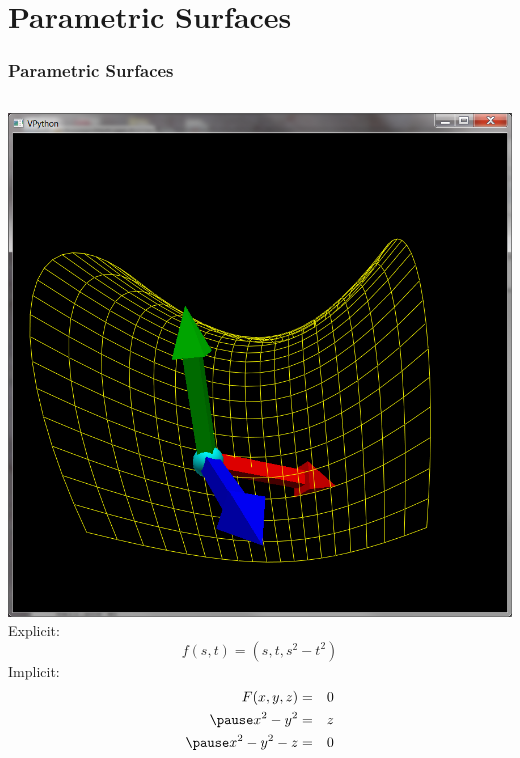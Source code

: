 \documentclass[slidestop,xcolor=pst]{beamer}
\newcommand{\sect}[1]{
\section{#1}
\begin{frame}[fragile]\frametitle{#1}
}
\begin{document}
\sect{Parametric Surfaces}
\begin{columns}[c]
\includegraphics[width=\textwidth]{images/vpythonpsurface.png}
Explicit:
\[
f(s,t) = (s, t, s^2-t^2)
\]
Implicit:
\begin{eqnarray*}
F(x,y,z) &=& 0\\\pause
x^2 - y^2 &=& z\\\pause
x^2 - y^2 - z &=& 0
\end{eqnarray*}
\end{columns}
\end{frame}
\end{document}
